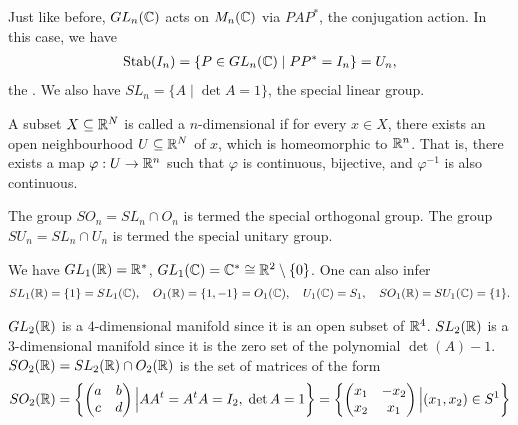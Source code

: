 Just like before, $GL_{n}(\mathbb{C})$ acts on $M_{n}(\mathbb{C})$ via $PAP^{\ast}$, the conjugation action. In this case, we have
\begin{align}
    \operatorname{Stab}(I_{n}) = \{P \in GL_{n}(\mathbb{C}) \mid PP^{\ast} = I_{n}\} = U_{n},
\end{align}
the . We also have $SL_{n} = \{A \mid \det A = 1\}$, the special linear group.

\begin{definition}
    A subset $X \subseteq \mathbb{R}^{N}$ is called a $n$-dimensional  if for every $x \in X$, there exists an open neighbourhood $U \subseteq \mathbb{R}^{N}$ of $x$, which is homeomorphic to $\mathbb{R}^{n}$. That is, there exists a map $\varphi : U \to \mathbb{R}^{n}$ such that $\varphi$ is continuous, bijective, and $\varphi^{-1}$ is also continuous.
\end{definition}

The group $SO_{n} = SL_{n} \cap O_{n}$ is termed the special orthogonal group. The group $SU_{n} = SL_{n} \cap U_{n}$ is termed the special unitary group.

\begin{example}
    We have $GL_{1}(\mathbb{R}) = \mathbb{R}^{\ast}$, $GL_{1}(\mathbb{C}) = \mathbb{C}^{\ast} \cong \mathbb{R}^{2} \setminus \{0\}$. One can also infer
    \begin{align}
        SL_{1}(\mathbb{R}) = \{1\} = SL_{1}(\mathbb{C}), \quad O_{1}(\mathbb{R}) = \{1,-1\} = O_{1}(\mathbb{C}),\quad U_{1}(\mathbb{C}) = S_{1},\quad SO_{1}(\mathbb{R}) = SU_{1}(\mathbb{C}) = \{1\}.
    \end{align}
\end{example}

\begin{example}
    $GL_{2}(\mathbb{R})$ is a $4$-dimensional manifold since it is an open subset of $\mathbb{R}^{4}$. $SL_{2}(\mathbb{R})$ is a $3$-dimensional manifold since it is the zero set of the polynomial $\det(A) - 1$. $SO_{2}(\mathbb{R}) = SL_{2}(\mathbb{R}) \cap O_{2}(\mathbb{R})$ is the set of matrices of the form
    \begin{align}
        SO_{2}(\mathbb{R}) = \left\{ \begin{pmatrix}
            a & b \\ c & d
        \end{pmatrix} \Big| AA^{t} = A^{t}A = I_{2},\; \det A = 1 \right\} = \left\{ \begin{pmatrix}
            x_{1} & -x_{2} \\ x_{2} & x_{1}
        \end{pmatrix} \Big| (x_{1},x_{2}) \in S^{1}\right\}
    \end{align}
\end{example}

